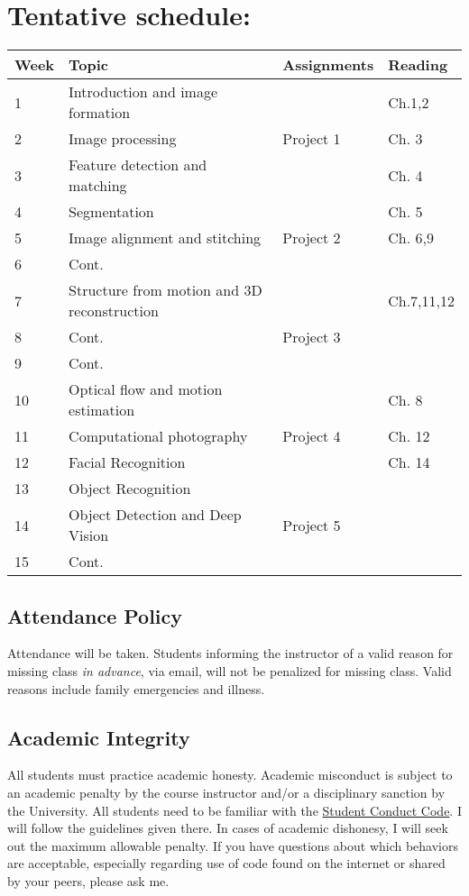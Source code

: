 \documentclass[12pt,letterpaper]{scrartcl}
\begin{document}
\section*{Tentative schedule:}
\begin{longtable}{| l | p{6cm} | p{3cm} | p{3cm} | }
\hline
\textbf{Week} & \textbf{Topic} & \textbf{Assignments} & \textbf{Reading} \\
\hline
1 & Introduction and image formation & & Ch.1,2  \\
2 & Image processing & Project 1 & Ch. 3 \\
3 & Feature detection and matching &  & Ch. 4 \\
4 & Segmentation & & Ch. 5 \\
5 & Image alignment and stitching & Project 2 & Ch. 6,9  \\
6 & Cont. & &  \\
7 & Structure from motion and 3D reconstruction & & Ch.7,11,12 \\
8 & Cont. & Project 3 &  \\
9 & Cont. & & \\  
10 & Optical flow and motion estimation & & Ch. 8\\
11 & Computational photography & Project 4 & Ch. 12 \\
12 & Facial Recognition &  & Ch. 14 \\
13 & Object Recognition &  & \\
14 & Object Detection and Deep Vision & Project 5 & \\
15 & Cont.  &  & \\
\hline
\end{longtable}

\subsection*{Attendance Policy}
Attendance will be taken.  Students informing the instructor of a valid
reason for missing class \textit{in advance}, via email, will not be penalized for missing class. Valid reasons include family emergencies and illness. 

\subsection*{Academic Integrity}
All students must practice academic honesty. Academic misconduct is subject to
an academic penalty by the course instructor and/or a disciplinary sanction by
the University. All students need to be familiar with the
\href{http://www.umt.edu/vpsa/policies/student_conduct.php}{Student Conduct
Code}. I will follow the guidelines given there. In cases of
academic dishonesy, I will seek out the maximum allowable penalty. If you have
questions about which behaviors are acceptable, especially regarding use of code  
found on the internet or shared by your peers, please ask me.
\end{document}
